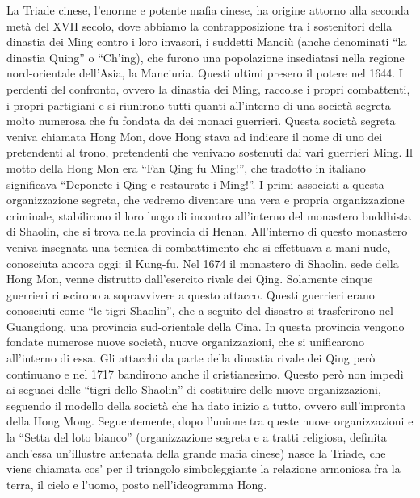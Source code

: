 \documentclass[a4paper, 11pt]{article}
\begin{document}


La Triade cinese, l’enorme e potente mafia cinese, ha origine attorno alla seconda metà del XVII secolo, dove abbiamo la contrapposizione tra i sostenitori della dinastia dei Ming contro i loro invasori, i suddetti Manciù (anche denominati “la dinastia Quing” o “Ch’ing), che furono una popolazione insediatasi nella regione nord-orientale dell’Asia, la Manciuria. Questi ultimi presero il potere nel 1644. I perdenti del confronto, ovvero la dinastia dei Ming, raccolse i propri combattenti, i propri partigiani e si riunirono tutti quanti all’interno di una società segreta molto numerosa che fu fondata da dei monaci guerrieri. Questa società segreta veniva chiamata Hong Mon, dove Hong stava ad indicare il nome di uno dei pretendenti al trono, pretendenti che venivano sostenuti dai vari guerrieri Ming. Il motto della Hong Mon era “Fan Qing fu Ming!”, che tradotto in italiano significava “Deponete i Qing e restaurate i Ming!”. I primi associati a questa organizzazione segreta, che vedremo diventare una vera e propria organizzazione criminale, stabilirono il loro luogo di incontro all’interno del monastero buddhista di Shaolin, che si trova nella provincia di Henan. All’interno di questo monastero veniva insegnata una tecnica di combattimento che si effettuava a mani nude, conosciuta ancora oggi: il Kung-fu. Nel 1674 il monastero di Shaolin, sede della Hong Mon, venne distrutto dall’esercito rivale dei Qing. Solamente cinque guerrieri riuscirono a sopravvivere a questo attacco. Questi guerrieri erano conosciuti come “le tigri Shaolin”, che a seguito del disastro si trasferirono nel Guangdong, una provincia sud-orientale della Cina. In questa provincia vengono fondate numerose nuove società, nuove organizzazioni, che si unificarono all’interno di essa. Gli attacchi da parte della dinastia rivale dei Qing però continuano e nel 1717 bandirono anche il cristianesimo. Questo però non impedì ai seguaci delle “tigri dello Shaolin” di costituire delle nuove organizzazioni, seguendo il modello della società che ha dato inizio a tutto, ovvero sull’impronta della Hong Mong. Seguentemente, dopo l’unione tra queste nuove organizzazioni e la “Setta del loto bianco” (organizzazione segreta e a tratti religiosa, definita anch’essa un’illustre antenata della grande mafia cinese) nasce la Triade, che viene chiamata cos’ per il triangolo simboleggiante la relazione armoniosa fra la terra, il cielo e l’uomo, posto nell’ideogramma Hong.
\end{document}
